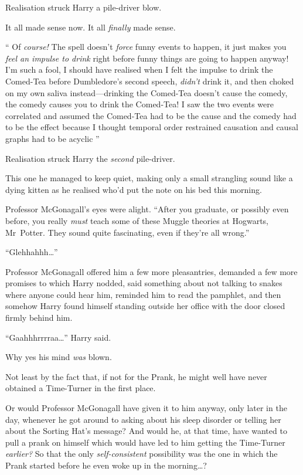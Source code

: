 Realisation struck Harry a pile-driver blow.

It all made sense now. It all \emph{finally} made sense.

“ Of \emph{course!} The spell doesn’t \emph{force} funny events to happen, it just makes you \emph{feel an impulse to drink} right before funny things are going to happen anyway! I’m such a fool, I should have realised when I felt the impulse to drink the Comed-Tea before Dumbledore’s second speech, \emph{didn’t} drink it, and then choked on my own saliva instead—drinking the Comed-Tea doesn’t cause the comedy, the comedy causes you to drink the Comed-Tea! I saw the two events were correlated and assumed the Comed-Tea had to be the cause and the comedy had to be the effect because I thought temporal order restrained causation and causal graphs had to be acyclic ”

Realisation struck Harry the \emph{second} pile-driver.

This one he managed to keep quiet, making only a small strangling sound like a dying kitten as he realised who’d put the note on his bed this morning.

Professor McGonagall’s eyes were alight. “After you graduate, or possibly even before, you really \emph{must} teach some of these Muggle theories at Hogwarts, Mr~Potter. They sound quite fascinating, even if they’re all wrong.”

“Glehhahhh…”

Professor McGonagall offered him a few more pleasantries, demanded a few more promises to which Harry nodded, said something about not talking to snakes where anyone could hear him, reminded him to read the pamphlet, and then somehow Harry found himself standing outside her office with the door closed firmly behind him.

“Gaahhhrrrraa…” Harry said.

Why yes his mind \emph{was} blown.

Not least by the fact that, if not for the Prank, he might well have never obtained a Time-Turner in the first place.

Or would Professor McGonagall have given it to him anyway, only later in the day, whenever he got around to asking about his sleep disorder or telling her about the Sorting Hat’s message? And would he, at that time, have wanted to pull a prank on himself which would have led to him getting the Time-Turner \emph{earlier?} So that the only \emph{self-consistent} possibility was the one in which the Prank started before he even woke up in the morning…?

